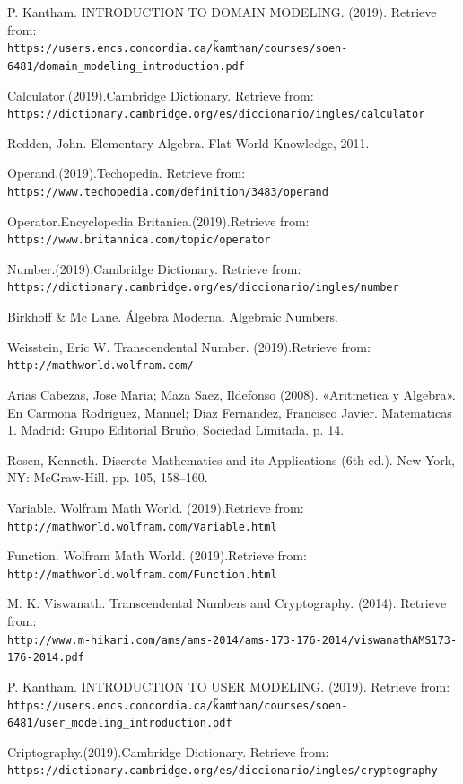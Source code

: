 \documentclass{report}
\begin{document}
\begin{thebibliography}{9}
P. Kantham. INTRODUCTION TO DOMAIN MODELING. (2019). Retrieve from:
\\\texttt{https://users.encs.concordia.ca/\~kamthan/courses/soen-6481/domain\_modeling\_introduction.pdf}

Calculator.(2019).Cambridge Dictionary. Retrieve from: \\\texttt{https://dictionary.cambridge.org/es/diccionario/ingles/calculator}

Redden, John. Elementary Algebra. Flat World Knowledge, 2011.

Operand.(2019).Techopedia. Retrieve from: \\\texttt{https://www.techopedia.com/definition/3483/operand}

Operator.Encyclopedia Britanica.(2019).Retrieve from: \\\texttt{https://www.britannica.com/topic/operator}

Number.(2019).Cambridge Dictionary. Retrieve from: \\\texttt{https://dictionary.cambridge.org/es/diccionario/ingles/number}

Birkhoff \& Mc Lane. Álgebra Moderna. Algebraic Numbers.

Weisstein, Eric W. Transcendental Number. (2019).Retrieve from: \\\texttt{http://mathworld.wolfram.com/}

Arias Cabezas, Jose Maria; Maza Saez, Ildefonso (2008). «Aritmetica y Algebra». En Carmona Rodriguez, Manuel; Diaz Fernandez, Francisco Javier. Matematicas 1. Madrid: Grupo Editorial Bruño, Sociedad Limitada. p. 14.

Rosen, Kenneth. Discrete Mathematics and its Applications (6th ed.). New York, NY: McGraw-Hill. pp. 105, 158–160.

Variable. Wolfram Math World. (2019).Retrieve from: \\\texttt{http://mathworld.wolfram.com/Variable.html}

Function. Wolfram Math World. (2019).Retrieve from: \\\texttt{http://mathworld.wolfram.com/Function.html}

M. K. Viswanath. Transcendental Numbers and Cryptography. (2014). Retrieve from: \\\texttt{http://www.m-hikari.com/ams/ams-2014/ams-173-176-2014/viswanathAMS173-176-2014.pdf}

P. Kantham. INTRODUCTION TO USER MODELING. (2019). Retrieve from:
\\\texttt{https://users.encs.concordia.ca/\~kamthan/courses/soen-6481/user\_modeling\_introduction.pdf}

Criptography.(2019).Cambridge Dictionary. Retrieve from: \\\texttt{https://dictionary.cambridge.org/es/diccionario/ingles/cryptography}

\end{thebibliography}
\end{document}
